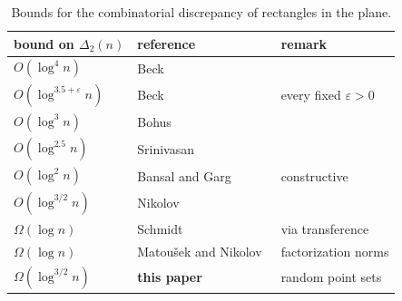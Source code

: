 \documentclass[11pt,letterpaper]{article}
\newcommand{\1}{\mathbf{1}}
\newcommand{\eps}{\varepsilon}
\begin{document}
\begin{table}[H]
\centering
\begin{tabular}{@{}lll@{}}
\toprule
bound on $\Delta_2(n)$ & reference & remark\\
\midrule
$O(\log^4n)$ & Beck~\cite{Bec81} & \\
$O(\log^{3.5+\eps}n)$ & Beck~\cite{Bec89} & every fixed $\eps>0$\\
$O(\log^3n)$ & Bohus~\cite{Boh90} & \\
$O(\log^{2.5}n)$ & Srinivasan~\cite{Sri97} & \\
$O(\log^2n)$ & Bansal and Garg~\cite{BG17} & constructive\\
$O(\log^{3/2}n)$ & Nikolov~\cite{Nik17} & \\
\midrule
$\Omega(\log n)$ & Schmidt~\cite{Sch72} & via transference \cite{Bec81,Mat99,ABN18}\\
$\Omega(\log n)$ & Matou\v{s}ek and Nikolov~\cite{MN15} & factorization norms\\
$\Omega(\log^{3/2}n)$ & \textbf{this paper} & random point sets\\
\bottomrule
\end{tabular}
\caption{Bounds for the combinatorial discrepancy of rectangles in the plane.}
\label{tab:bounds}
\end{table}
\end{document}
